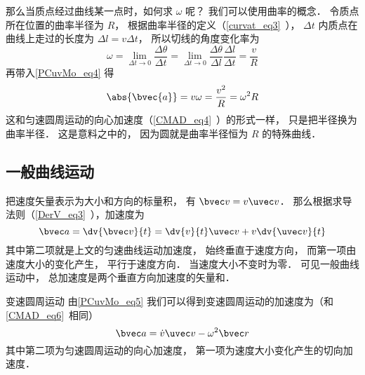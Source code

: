那么当质点经过曲线某一点时，如何求 $\omega$ 呢？ 我们可以使用曲率的概念． 令质点所在位置的曲率半径为 $R$， 根据曲率半径的定义（\autoref{curvat_eq3}~）， $\Delta t$ 内质点在曲线上走过的长度为 $\Delta l = v \Delta t$， 所以切线的角度变化率为
\begin{equation}
\omega = \lim_{\Delta t\to 0}\frac{\Delta \theta}{\Delta t} = \lim_{\Delta t\to 0}\frac{\Delta \theta}{\Delta l} \frac{\Delta l}{\Delta t} = \frac{v}{R}
\end{equation}
再带入\autoref{PCuvMo_eq4} 得
\begin{equation}\label{PCuvMo_eq3}
\abs{\bvec{a}} = v\omega = \frac{v^2}{R} = \omega^2 R
\end{equation}
这和匀速圆周运动的向心加速度（\autoref{CMAD_eq4}~）的形式一样， 只是把半径换为曲率半径． 这是意料之中的， 因为圆就是曲率半径恒为 $R$ 的特殊曲线．

\subsection{一般曲线运动}
把速度矢量表示为大小和方向的标量积， 有 $\bvec v = v\uvec v$． 那么根据求导法则（\autoref{DerV_eq3}~），加速度为
\begin{equation}\label{PCuvMo_eq5}
\bvec a = \dv{\bvec v}{t} = \dv{v}{t}\uvec v + v\dv{\uvec v}{t}
\end{equation}
其中第二项就是上文的匀速曲线运动加速度， 始终垂直于速度方向， 而第一项由速度大小的变化产生， 平行于速度方向． 当速度大小不变时为零． 可见一般曲线运动中， 总加速度是两个垂直方向加速度的矢量和．

\begin{example}{变速圆周运动}\label{PCuvMo_ex1}
由\autoref{PCuvMo_eq5} 我们可以得到变速圆周运动的加速度为（和\autoref{CMAD_eq6}~相同）
\begin{equation}
\bvec a = \dot v \uvec v - \omega ^2 \bvec r
\end{equation}
其中第二项为匀速圆周运动的向心加速度， 第一项为速度大小变化产生的切向加速度．
\end{example}
